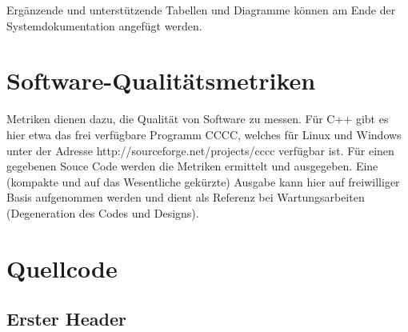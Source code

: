 Ergänzende und unterstützende Tabellen und Diagramme können am Ende der Systemdokumentation angefügt werden.


\section{Software-Qualitätsmetriken}

Metriken dienen dazu, die Qualität von Software zu messen. Für C++ gibt es hier
etwa das frei verfügbare Programm CCCC, welches für Linux und Windows unter
der Adresse http://sourceforge.net/projects/cccc verfügbar ist. Für einen gegebenen
Souce Code werden die Metriken ermittelt und ausgegeben. Eine (kompakte und auf
das Wesentliche gekürzte) Ausgabe kann hier auf freiwilliger Basis aufgenommen
werden und dient als Referenz bei Wartungsarbeiten (Degeneration des Codes und
Designs).

\section{Quellcode}

\subsection{Erster Header}



